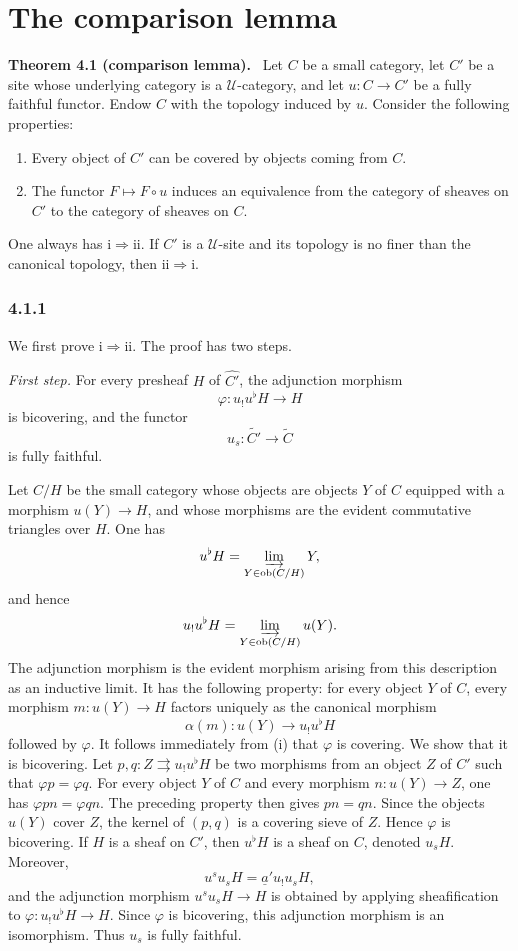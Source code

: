 \documentclass[11pt]{article}
\newcommand{\U}{\mathcal{U}}
\newcommand{\ob}{\operatorname{ob}}
\newenvironment{statement}[1]{\par\medskip\noindent\textbf{#1.}\ }{\par\medskip}
\begin{document}
\section{The comparison lemma}

\begin{statement}{Theorem 4.1 (comparison lemma)}
Let \(C\) be a small category, let \(C'\) be a site whose underlying category is a \(\U\)-category, and let \(u:C\to C'\) be a fully faithful functor. Endow \(C\) with the topology induced by \(u\). Consider the following properties:
\begin{enumerate}[label=\roman*)]
\item Every object of \(C'\) can be covered by objects coming from \(C\).
\item The functor \(F\mapsto F\circ u\) induces an equivalence from the category of sheaves on \(C'\) to the category of sheaves on \(C\).
\end{enumerate}
One always has \(\mathrm{i}\Rightarrow\mathrm{ii}\). If \(C'\) is a \(\U\)-site and its topology is no finer than the canonical topology, then \(\mathrm{ii}\Rightarrow\mathrm{i}\).
\end{statement}

\subsubsection*{4.1.1}
We first prove \(\mathrm{i}\Rightarrow\mathrm{ii}\). The proof has two steps.

\emph{First step.} For every presheaf \(H\) of \(\widehat{C'}\), the adjunction morphism
\[
\varphi:u_!u^\flat H\to H
\]
is bicov\-ering, and the functor
\[
u_s:\widetilde{C'}\to\widetilde C
\]
is fully faithful.

Let \(C/H\) be the small category whose objects are objects \(Y\) of \(C\) equipped with a morphism \(u(Y)\to H\), and whose morphisms are the evident commutative triangles over \(H\). One has
\[
u^\flat H=\varinjlim_{Y\in\ob(C/H)}Y,
\]
and hence
\[
u_!u^\flat H=\varinjlim_{Y\in\ob(C/H)}u(Y).
\]
The adjunction morphism is the evident morphism arising from this description as an inductive limit. It has the following property: for every object \(Y\) of \(C\), every morphism \(m:u(Y)\to H\) factors uniquely as the canonical morphism
\[
\alpha(m):u(Y)\to u_!u^\flat H
\]
followed by \(\varphi\). It follows immediately from (i) that \(\varphi\) is covering. We show that it is bicov\-ering. Let \(p,q:Z\rightrightarrows u_!u^\flat H\) be two morphisms from an object \(Z\) of \(C'\) such that \(\varphi p=\varphi q\). For every object \(Y\) of \(C\) and every morphism \(n:u(Y)\to Z\), one has \(\varphi pn=\varphi qn\). The preceding property then gives \(pn=qn\). Since the objects \(u(Y)\) cover \(Z\), the kernel of \((p,q)\) is a covering sieve of \(Z\). Hence \(\varphi\) is bicov\-ering. If \(H\) is a sheaf on \(C'\), then \(u^\flat H\) is a sheaf on \(C\), denoted \(u_sH\). Moreover,
\[
u^su_sH=\underline a'u_!u_sH,
\]
and the adjunction morphism \(u^su_sH\to H\) is obtained by applying sheafification to \(\varphi:u_!u^\flat H\to H\). Since \(\varphi\) is bicov\-ering, this adjunction morphism is an isomorphism. Thus \(u_s\) is fully faithful.
\end{document}
